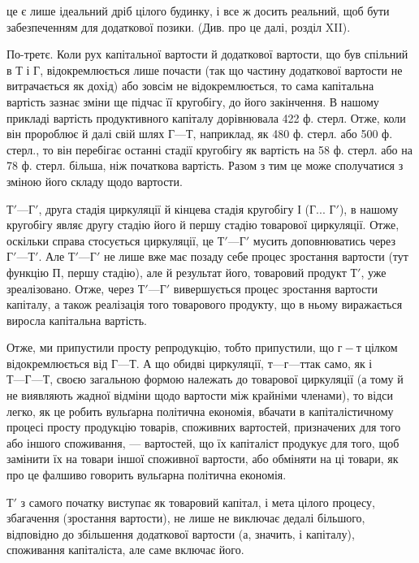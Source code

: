 \parcont{}  %
це є лише ідеальний дріб цілого будинку, і все ж досить реальний, щоб
бути забезпеченням для додаткової позики. (Див. про це далі, розділ XII).

По-третє. Коли рух капітальної вартости й додаткової вартости, що
був спільний в Т і Г, відокремлюється лише почасти (так що частину
додаткової вартости не витрачається як дохід) або зовсім не відокремлюється,
то сама капітальна вартість зазнає зміни ще підчас її кругобігу,
до його закінчення. В нашому прикладі вартість продуктивного капіталу
дорівнювала 422 ф. стерл. Отже, коли він пророблює й далі свій шлях
$Г — Т$, наприклад, як 480 ф. стерл. або 500 ф. стерл., то він перебігає
останні стадії кругобігу як вартість на 58 ф. стерл. або на 78 ф. стерл.
більша, ніж початкова вартість. Разом з тим це може сполучатися з зміною
його складу щодо вартости.

$Т' — Г'$, друга стадія циркуляції й кінцева стадія кругобігу І (Г... $Г'$),
в нашому кругобігу являє другу стадію його й першу стадію товарової
циркуляції. Отже, оскільки справа стосується циркуляції, це $Т' — Г'$ мусить
доповнюватись через $Г' — Т'$. Але $Т' — Г'$ не лише вже має позаду себе процес
зростання вартости (тут функцію П, першу стадію), але й результат його,
товаровий продукт $Т'$, уже зреалізовано. Отже, через $Т' — Г'$ вивершується
процес зростання вартости капіталу, а також реалізація того товарового продукту,
що в ньому виражається виросла капітальна вартість.

Отже, ми припустили просту репродукцію, тобто припустили, що
$г-т$ цілком відокремлюється від $Г — Т$. А що обидві циркуляції,
$т — г — т т$ак само, як і $Т — Г — Т$, своєю загальною формою належать
до товарової циркуляції (а тому й не виявляють жадної відміни щодо
вартости між крайніми членами), то відси легко, як це робить вульґарна
політична економія, вбачати в капіталістичному процесі просту
продукцію товарів, споживних вартостей, призначених для того або іншого
споживання, — вартостей, що їх капіталіст продукує для того, щоб замінити
їх на товари іншої споживної вартости, або обміняти на ці товари, як
про це фалшиво говорить вульґарна політична економія.

$Т'$ з самого початку виступає як товаровий капітал, і мета цілого
процесу, збагачення (зростання вартости), не лише не виключає дедалі
більшого, відповідно до збільшення додаткової вартости (а, значить, і
капіталу), споживання капіталіста, але саме включає його.

